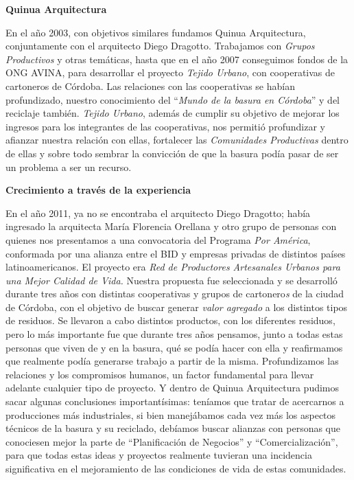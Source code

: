 \begin{fullwidth}
\textbf{Quinua Arquitectura}

En el año 2003, con objetivos similares fundamos Quinua Arquitectura,
conjuntamente con el arquitecto Diego Dragotto. Trabajamos con
\emph{Grupos Productivos} y otras temáticas, hasta que en el año 2007
conseguimos fondos de la ONG AVINA, para desarrollar el proyecto
\emph{Tejido Urbano}, con cooperativas de cartoneros de Córdoba. Las
relaciones con las cooperativas se habían profundizado, nuestro
conocimiento del ``\emph{Mundo de la basura en Córdoba}'' y del
reciclaje también. \emph{Tejido Urbano}, además de cumplir su objetivo
de mejorar los ingresos para los integrantes de las cooperativas, nos
permitió profundizar y afianzar nuestra relación con ellas, fortalecer
las \emph{Comunidades Productivas} dentro de ellas y sobre todo sembrar
la convicción de que la basura podía pasar de ser un problema a ser un
recurso.

\textbf{Crecimiento a través de la experiencia}

En el año 2011, ya no se encontraba el arquitecto Diego Dragotto; había
ingresado la arquitecta María Florencia Orellana y otro grupo de
personas con quienes nos presentamos a una convocatoria del Programa
\emph{Por América}, conformada por una alianza entre el BID y empresas
privadas de distintos países latinoamericanos. El proyecto era \emph{Red
de Productores Artesanales Urbanos para una Mejor Calidad de Vida.}
Nuestra propuesta fue seleccionada y se desarrolló durante tres años con
distintas cooperativas y grupos de cartonero\emph{s} de la ciudad de
Córdoba, con el objetivo de buscar generar \emph{valor agregado} a los
distintos tipos de residuos. Se llevaron a cabo distintos productos, con
los diferentes residuos, pero lo más importante fue que durante tres
años pensamos, junto a todas estas personas que viven de y en la basura,
qué se podía hacer con ella y reafirmamos que realmente podía generarse
trabajo a partir de la misma. Profundizamos las relaciones y los
compromisos humanos, un factor fundamental para llevar adelante
cualquier tipo de proyecto. Y dentro de Quinua Arquitectura pudimos
sacar algunas conclusiones importantísimas: teníamos que tratar de
acercarnos a producciones más industriales, si bien manejábamos cada vez
más los aspectos técnicos de la basura y su reciclado, debíamos buscar
alianzas con personas que conociesen mejor la parte de ``Planificación
de Negocios'' y ``Comercialización'', para que todas estas ideas y
proyectos realmente tuvieran una incidencia significativa en el
mejoramiento de las condiciones de vida de estas comunidades.


\end{fullwidth}

